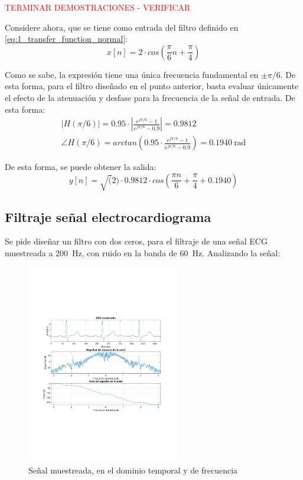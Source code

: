 		\textcolor{red}{TERMINAR DEMOSTRACIONES - VERIFICAR}
		
		 Considere ahora, que se tiene como entrada del filtro definido en \ref{eq:1_transfer_function_normal}:
		 \begin{equation*}
		 	x[n] = 2 \cdot cos \left( \frac{\pi}{6}n + \frac{\pi}{4} \right)
		 \end{equation*}
		 
		Como se sabe, la expresión tiene una única frecuencia fundamental en $\pm \pi/6$. De esta forma, para el filtro diseñado en el punto anterior, basta evaluar únicamente el efecto de la atenuación y desfase para la frecuencia de la señal de entrada. De esta forma:
		\begin{align}
			|H(\pi/6)| = 0.95 \cdot \left| \frac{e^{j\pi/6} - 1}{e^{j\pi/6} - 0.9} \right| = 0.9812 \\
			\angle H(\pi/6) = arctan\left( 0.95 \cdot \frac{e^{j\pi/6} - 1}{e^{j\pi/6} - 0.9} \right) = 0.1940~\text{rad} 
		\end{align}
		
		De esta forma, se puede obtener la salida:
		\begin{equation}
			y[n] = \sqrt(2) \cdot 0.9812 \cdot cos \left( \frac{\pi n}{6} + \frac{\pi}{4} + 0.1940 \right)
		\end{equation}
		
	\subsection{Filtraje señal electrocardiograma}
		Se pide diseñar un filtro con dos ceros, para el filtraje de una señal ECG muestreada a 200~Hz, con ruido en la banda de 60~Hz. Analizando la señal:
		\begin{figure}[H]
			\center
			\includegraphics[width=0.6\textwidth,clip, trim = {1.9cm 6.8cm 2.3cm 7cm}]{../plots/ecg_time_freq.pdf}
			\caption{Señal muestreada, en el dominio temporal y de frecuencia}
			\label{fig:ecg_time_freq}
		\end{figure}		
				
